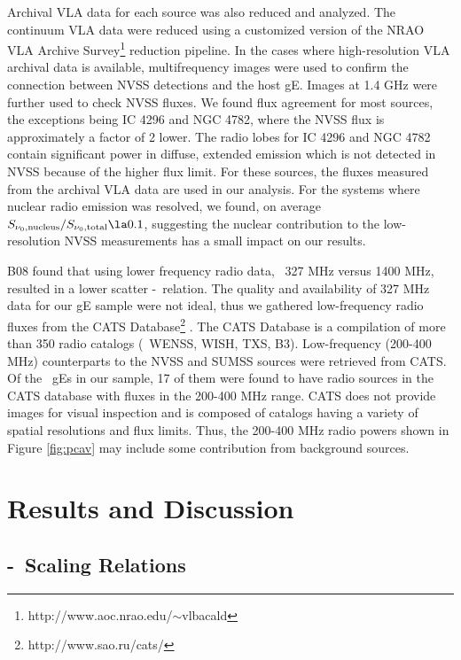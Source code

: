 \documentclass{emulateapj}
\begin{document}
Archival VLA data for each source was also reduced and analyzed. The
continuum VLA data were reduced using a customized version of the NRAO
VLA Archive Survey\footnote{http://www.aoc.nrao.edu/$\sim$vlbacald}
reduction pipeline. In the cases where high-resolution VLA archival
data is available, multifrequency images were used to confirm the
connection between NVSS detections and the host gE. Images at 1.4 GHz
were further used to check NVSS fluxes. We found flux agreement for
most sources, the exceptions being IC 4296 and NGC 4782, where the
NVSS flux is approximately a factor of 2 lower. The radio lobes for IC
4296 and NGC 4782 contain significant power in diffuse, extended
emission which is not detected in NVSS because of the higher flux
limit. For these sources, the fluxes measured from the archival VLA
data are used in our analysis. For the systems where nuclear radio
emission was resolved, we found, on average
$S_{\nu_0,\mathrm{nucleus}} / S_{\nu_0,\mathrm{total}} \la 0.1$,
suggesting the nuclear contribution to the low-resolution NVSS
measurements has a small impact on our results.

B08 found that using lower frequency radio data, \ie\ 327 MHz versus
1400 MHz, resulted in a lower scatter \pjet-\prad\ relation. The
quality and availability of 327 MHz data for our gE sample were not
ideal, thus we gathered low-frequency radio fluxes from the CATS
Database\footnote{http://www.sao.ru/cats/} \citep{cats}. The CATS
Database is a compilation of more than 350 radio catalogs (\eg\ WENSS,
WISH, TXS, B3). Low-frequency (200-400 MHz) counterparts to the NVSS
and SUMSS sources were retrieved from CATS. Of the \samp\ gEs in our
sample, 17 of them were found to have radio sources in the CATS
database with fluxes in the 200-400 MHz range. CATS does not provide
images for visual inspection and is composed of catalogs having a
variety of spatial resolutions and flux limits. Thus, the 200-400 MHz
radio powers shown in Figure \ref{fig:pcav} may include some
contribution from background sources.

\section{Results and Discussion}
\label{sec:r&d}

\subsection{\pjet-\prad\ Scaling Relations}
\label{sec:relation}
\end{document}
